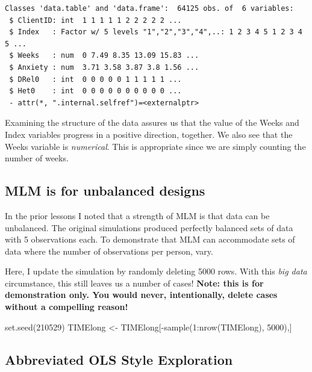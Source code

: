 \documentclass[
  english,
]{book}
\newenvironment{Shaded}{\begin{snugshade}}{\end{snugshade}}
\newcommand{\DecValTok}[1]{\textcolor[rgb]{0.00,0.00,0.81}{#1}}
\newcommand{\FunctionTok}[1]{\textcolor[rgb]{0.00,0.00,0.00}{#1}}
\newcommand{\NormalTok}[1]{#1}
\newcommand{\OtherTok}[1]{\textcolor[rgb]{0.56,0.35,0.01}{#1}}
\newcommand{\SpecialCharTok}[1]{\textcolor[rgb]{0.00,0.00,0.00}{#1}}
\begin{document}
\begin{verbatim}
Classes 'data.table' and 'data.frame':  64125 obs. of  6 variables:
 $ ClientID: int  1 1 1 1 1 2 2 2 2 2 ...
 $ Index   : Factor w/ 5 levels "1","2","3","4",..: 1 2 3 4 5 1 2 3 4 5 ...
 $ Weeks   : num  0 7.49 8.35 13.09 15.83 ...
 $ Anxiety : num  3.71 3.58 3.87 3.8 1.56 ...
 $ DRel0   : int  0 0 0 0 0 1 1 1 1 1 ...
 $ Het0    : int  0 0 0 0 0 0 0 0 0 0 ...
 - attr(*, ".internal.selfref")=<externalptr> 
\end{verbatim}

Examining the structure of the data assures us that the value of the Weeks and Index variables progress in a positive direction, together. We also see that the Weeks variable is \emph{numerical}. This is appropriate since we are simply counting the number of weeks.

\hypertarget{mlm-is-for-unbalanced-designs}{%
\subsection{MLM is for unbalanced designs}\label{mlm-is-for-unbalanced-designs}}

In the prior lessons I noted that a strength of MLM is that data can be unbalanced. The original simulations produced perfectly balanced sets of data with 5 observations each. To demonstrate that MLM can accommodate sets of data where the number of observations per person, vary.

Here, I update the simulation by randomly deleting 5000 rows. With this \emph{big data} circumstance, this still leaves us a number of cases! \textbf{Note: this is for demonstration only. You would never, intentionally, delete cases without a compelling reason!}

\begin{Shaded}
\begin{Highlighting}[]
\FunctionTok{set.seed}\NormalTok{(}\DecValTok{210529}\NormalTok{)}
\NormalTok{TIMElong }\OtherTok{\textless{}{-}}\NormalTok{ TIMElong[}\SpecialCharTok{{-}}\FunctionTok{sample}\NormalTok{(}\DecValTok{1}\SpecialCharTok{:}\FunctionTok{nrow}\NormalTok{(TIMElong), }\DecValTok{5000}\NormalTok{),]}
\end{Highlighting}
\end{Shaded}

\hypertarget{abbreviated-ols-style-exploration}{%
\subsection{Abbreviated OLS Style Exploration}\label{abbreviated-ols-style-exploration}}
\end{document}
